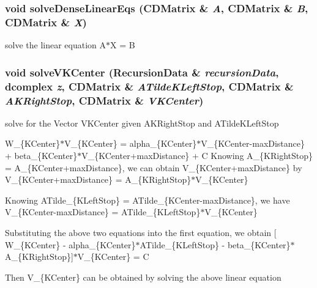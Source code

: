 \subsubsection{\setlength{\rightskip}{0pt plus 5cm}void solve\-Dense\-Linear\-Eqs (\bf{CDMatrix} \& {\em A}, \bf{CDMatrix} \& {\em B}, \bf{CDMatrix} \& {\em X})}\label{recursiveCalculation_8cpp_f519514f8f6d6155af66d593f73e4e1d}


solve the linear equation A$\ast$X = B 
\subsubsection{\setlength{\rightskip}{0pt plus 5cm}void solve\-VKCenter (\bf{Recursion\-Data} \& {\em recursion\-Data}, \bf{dcomplex} {\em z}, \bf{CDMatrix} \& {\em ATilde\-KLeft\-Stop}, \bf{CDMatrix} \& {\em AKRight\-Stop}, \bf{CDMatrix} \& {\em VKCenter})}\label{recursiveCalculation_8cpp_e097b7a86f8594f1b00c6f8c99c17a08}


solve for the Vector VKCenter given AKRight\-Stop and ATilde\-KLeft\-Stop

W\_\-\{KCenter\}$\ast$V\_\-\{KCenter\} = alpha\_\-\{KCenter\}$\ast$V\_\-\{KCenter-max\-Distance\} + beta\_\-\{KCenter\}$\ast$V\_\-\{KCenter+max\-Distance\} + C Knowing A\_\-\{KRight\-Stop\} = A\_\-\{KCenter+max\-Distance\}, we can obtain V\_\-\{KCenter+max\-Distance\} by V\_\-\{KCenter+max\-Distance\} = A\_\-\{KRight\-Stop\}$\ast$V\_\-\{KCenter\}

Knowing ATilde\_\-\{KLeft\-Stop\} = ATilde\_\-\{KCenter-max\-Distance\}, we have V\_\-\{KCenter-max\-Distance\} = ATilde\_\-\{KLeft\-Stop\}$\ast$V\_\-\{KCenter\}

Substituting the above two equations into the first equation, we obtain [ W\_\-\{KCenter\} - alpha\_\-\{KCenter\}$\ast$ATilde\_\-\{KLeft\-Stop\} - beta\_\-\{KCenter\}$\ast$A\_\-\{KRight\-Stop\}]$\ast$V\_\-\{KCenter\} = C

Then V\_\-\{KCenter\} can be obtained by solving the above linear equation 